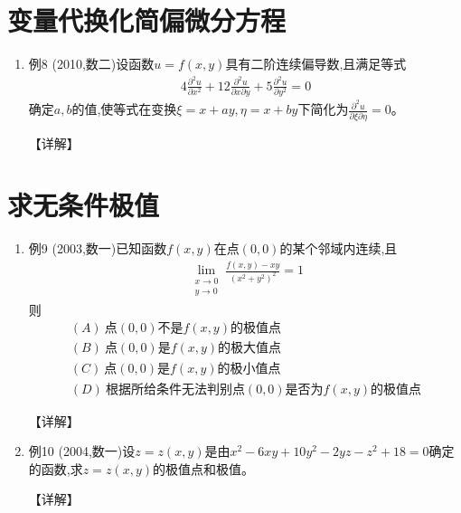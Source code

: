 \documentclass[12pt, a4paper, oneside, UTF8]{ctexbook}
\begin{document}
\section{变量代换化简偏微分方程}

\begin{enumerate}[label=\arabic*.,start=8]
    \item 例8 (2010,数二)设函数$u=f(x,y)$具有二阶连续偏导数,且满足等式
    \begin{align*}
        4\frac{\partial^2 u}{\partial x^2}+12\frac{\partial^2 u}{\partial x\partial y}+5\frac{\partial^2 u}{\partial y^2}=0
    \end{align*}
    确定$a,b$的值,使等式在变换$\xi=x+ay,\eta=x+by$下简化为$\frac{\partial^2 u}{\partial \xi\partial \eta}=0$。
    
    \begin{solution}
    【详解】
    \end{solution}
\end{enumerate}

\section{求无条件极值}

\begin{enumerate}[label=\arabic*.,start=9]
    \item 例9 (2003,数一)已知函数$f(x,y)$在点$(0,0)$的某个邻域内连续,且
    \begin{align*}
        \lim_{\substack{x\to 0\\ y\to 0}}\frac{f(x,y)-xy}{(x^2+y^2)^2}=1
    \end{align*}
    则
    \begin{align*}
        (A)\ \text{点}(0,0)\text{不是}f(x,y)\text{的极值点} \\
        (B)\ \text{点}(0,0)\text{是}f(x,y)\text{的极大值点} \\
        (C)\ \text{点}(0,0)\text{是}f(x,y)\text{的极小值点} \\
        (D)\ \text{根据所给条件无法判别点}(0,0)\text{是否为}f(x,y)\text{的极值点}
    \end{align*}
    
    \begin{solution}
    【详解】
    \end{solution}
    
    \item 例10 (2004,数一)设$z=z(x,y)$是由$x^2-6xy+10y^2-2yz-z^2+18=0$确定的函数,求$z=z(x,y)$的极值点和极值。
    
    \begin{solution}
    【详解】
    \end{solution}
\end{enumerate}
\end{document}
